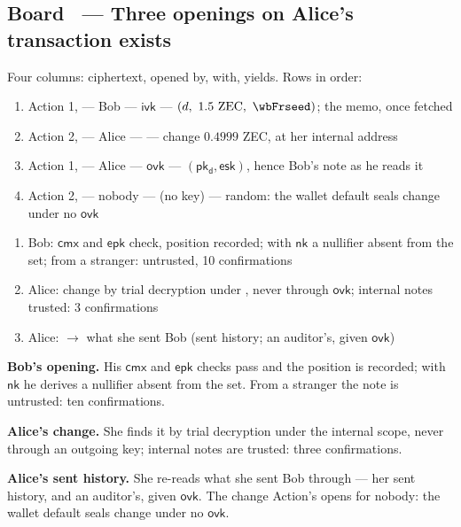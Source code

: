 \documentclass[11pt,a4paper]{article}
\makeatletter
\newcommand{\cmx}{\ensuremath{\mathsf{cmx}}}
\newcommand{\pkd}{\ensuremath{\mathsf{pk_d}}}
\newcommand{\nksym}{\ensuremath{\mathsf{nk}}}
\newcommand{\ivk}{\ensuremath{\mathsf{ivk}}}
\newcommand{\ovk}{\ensuremath{\mathsf{ovk}}}
\newcommand{\esk}{\ensuremath{\mathsf{esk}}}
\newcommand{\epk}{\ensuremath{\mathsf{epk}}}
\newcounter{board}
\newenvironment{board}[2]{\stepcounter{board}%
  \subsection*{Board \theboard\ --- #1 \hfill {\normalfont\small\color{arb}#2}}}{\medskip}
\newcommand{\Draw}{\draw@head{Draw}}
\newcommand{\Write}{\draw@head{Write}}
\newcommand{\Say}{\draw@head{Say}}
\makeatother
\begin{document}
\begin{board}{Three openings on Alice's transaction}{exists}
\Draw
Four columns: ciphertext, opened by, with, yields. Rows in order:
\begin{enumerate}
  \item Action 1, \wbFenc{} --- Bob --- \ivk{} --- $(d,\ 1.5\
    \text{ZEC},\ \wbFrseed)$; the memo, once fetched
  \item Action 2, \wbFenc{} --- Alice --- \wbFivkint{} --- change
    $0.4999$ ZEC, at her internal address
  \item Action 1, \wbFout{} --- Alice --- \ovk{} --- $(\pkd, \esk)$,
    hence Bob's note as he reads it
  \item Action 2, \wbFout{} --- nobody --- (no key) --- random: the
    wallet default seals change under no \ovk
\end{enumerate}
\Write
\begin{enumerate}
  \item Bob: \cmx{} and \epk{} check, position recorded; with \nksym{} a
    nullifier absent from the set; from a stranger: untrusted, 10
    confirmations
  \item Alice: change by trial decryption under \wbFivkint, never
    through \ovk; internal notes trusted: 3 confirmations
  \item Alice: \wbFout{} $\to$ what she sent Bob (sent history; an
    auditor's, given \ovk)
\end{enumerate}
\Say
\textbf{Bob's opening.} His \cmx{} and \epk{} checks pass and the
position is recorded; with \nksym{} he derives a nullifier absent from
the set. From a stranger the note is untrusted: ten confirmations.

\textbf{Alice's change.} She finds it by trial decryption under the
internal scope, never through an outgoing key; internal notes are
trusted: three confirmations.

\textbf{Alice's sent history.} She re-reads what she sent Bob through
\wbFout{} --- her sent history, and an auditor's, given \ovk. The
change Action's \wbFout{} opens for nobody: the wallet default seals
change under no \ovk.


\end{board}
\end{document}
